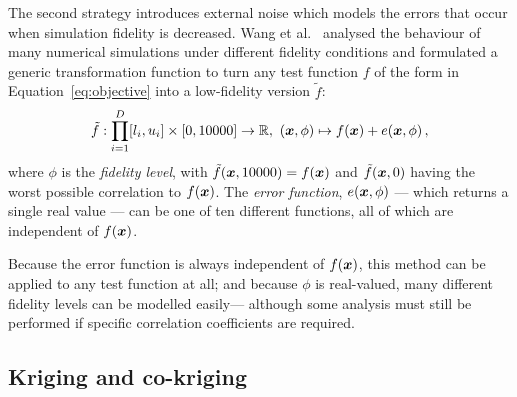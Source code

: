 \documentclass[journal]{IEEEtran}
\begin{document}
The second strategy introduces external noise which models the errors that occur when simulation fidelity is decreased. Wang et al.~\cite{wang2017generic} analysed the behaviour of many numerical simulations under different fidelity conditions and 
formulated a generic transformation function to turn any test function $f$ of the form in Equation~\ref{eq:objective} into a low-fidelity version $\tilde f$:
\begin{equation}
\tilde f: \displaystyle\prod^D_{i=1}[l_i,u_i] \times [0,10000] \to \mathbb{R},\ (\V{x},\phi) \mapsto f(\V{x}) + e(\V{x},\phi)\,,\label{eq:error-fn}
\end{equation}
where $\phi$ is the \emph{fidelity level}, with $\tilde f(\boldsymbol{x},10000) = f(\boldsymbol{x})$ and $\tilde f(\boldsymbol{x},0)$ having the worst possible correlation to $f(\boldsymbol{x})$. The \emph{error function}, $e(\boldsymbol{x},\phi)$ --- which returns a single real value --- can be one of ten different functions, all of which are independent of $f(\boldsymbol{x})$.

Because the error function is always independent of $f(\boldsymbol{x})$, this method can be applied to any test function at all; and because $\phi$ is real-valued, many different fidelity levels can be modelled easily--- although some analysis must still be performed if specific correlation coefficients are required.

\subsection{Kriging and co-kriging}
\end{document}
